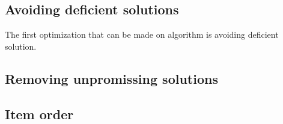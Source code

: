 \subsection{Avoiding deficient solutions}

The first optimization that can be made on algorithm is avoiding deficient solution.

\subsection{Removing unpromissing solutions}

\subsection{Item order}



